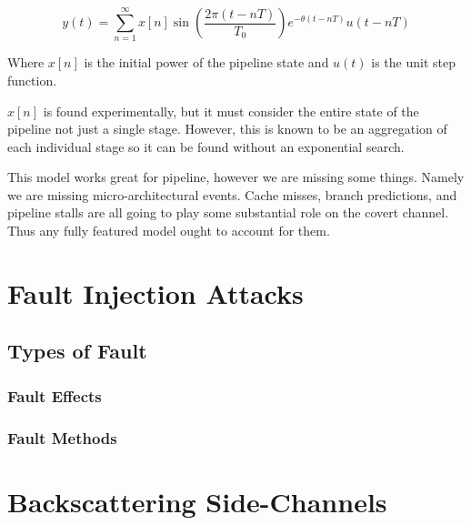     \begin{equation}
      \label{eq:covert_channel_model}
      y(t) = \sum_{n = 1}^{\infty} x[n] \sin \left(\frac{2\pi (t-nT)}{T_0}\right) e^{-\theta (t-nT)} u(t-nT)
    \end{equation}

    Where $x[n]$ is the initial power of the pipeline state and $u(t)$ is the unit step function.

    $x[n]$ is found experimentally, but it must consider the entire state of the pipeline not just a single stage.
    However, this is known to be an aggregation of each individual stage so it can be found without an exponential search.

    This model works great for pipeline, however we are missing some things.
    Namely we are missing micro-architectural events.
    Cache misses, branch predictions, and pipeline stalls are all going to play some substantial role on the covert channel.
    Thus any fully featured model ought to account for them.

\section{Fault Injection Attacks}

  \subsection{Types of Fault}

    \subsubsection{Fault Effects}

    \subsubsection{Fault Methods}

  \subsection{}

\section{Backscattering Side-Channels}
